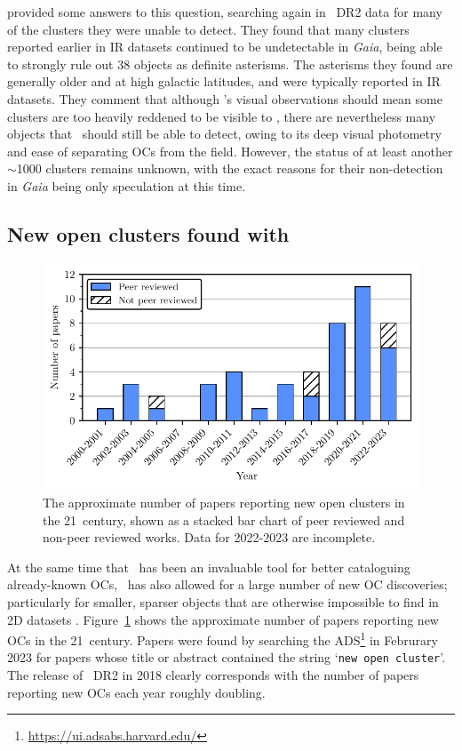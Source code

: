 \cite{cantat-gaudin_clusters_2020} provided some answers to this question, searching again in \gaia\ DR2 data for many of the clusters they were unable to detect. They found that many clusters reported earlier in IR datasets continued to be undetectable in \emph{Gaia}, being able to strongly rule out 38 objects as definite asterisms. The asterisms they found are generally older and at high galactic latitudes, and were typically reported in IR datasets. They comment that although \gaia's visual observations should mean some clusters are too heavily reddened to be visible to \gaia, there are nevertheless many objects that \gaia\ should still be able to detect, owing to its deep visual photometry and ease of separating OCs from the field. However, the status of at least another $\sim$1000 clusters remains unknown, with the exact reasons for their non-detection in \emph{Gaia} being only speculation at this time. 


\subsection{New open clusters found with \gaia}
\label{sec:intro:gaia:new_clusters}

\begin{figure}[tb]
	\includegraphics[width=\textwidth]{fig/c1/papers.pdf}
	\caption[The approximate number of papers reporting new open clusters in the 21\first\ century]{The approximate number of papers reporting new open clusters in the 21\first\ century, shown as a stacked bar chart of peer reviewed and non-peer reviewed works. Data for 2022-2023 are incomplete.}
	\label{fig:intro:history:papers}
\end{figure}

At the same time that \gaia\ has been an invaluable tool for better cataloguing already-known OCs, \gaia\ has also allowed for a large number of new OC discoveries; particularly for smaller, sparser objects that are otherwise impossible to find in 2D datasets \citep{cantat-gaudin_milky_2022}. Figure~\ref{fig:intro:history:papers} shows the approximate number of papers reporting new OCs in the 21\first\ century. Papers were found by searching the ADS\footnote{\url{https://ui.adsabs.harvard.edu/}} in Februrary 2023 for papers whose title or abstract contained the string `\texttt{new open cluster}'. The release of \gaia\ DR2 in 2018 \citep{brown_gaia_2018} clearly corresponds with the number of papers reporting new OCs each year roughly doubling.

